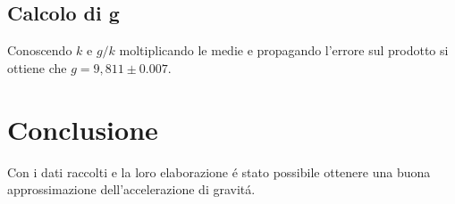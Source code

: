 \documentclass{exam}
\begin{document}
		\subsection{Calcolo di g}
			Conoscendo $k$ e $g/k$ moltiplicando le medie e propagando l'errore sul prodotto si ottiene che $g=9,811\pm 0.007$.

	\section{Conclusione}
		Con i dati raccolti e la loro elaborazione \'e stato possibile ottenere una buona approssimazione dell'accelerazione di gravit\'a.
\end{document}
